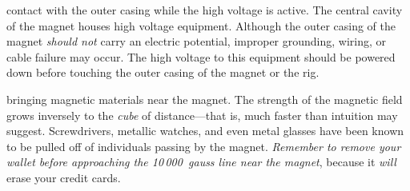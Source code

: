\begin{avoid} contact with the outer casing while the high voltage is active.  The central cavity of the magnet houses high voltage equipment.  Although the outer casing of the magnet \textit{should not} carry an electric potential, improper grounding, wiring, or cable failure may occur.  The high voltage to this equipment should be powered down before touching the outer casing of the magnet or the rig.\end{avoid}

\begin{avoid} bringing magnetic materials near the magnet.  The strength of the magnetic field grows inversely to the \textit{cube} of distance---that is, much faster than intuition may suggest.  Screwdrivers, metallic watches, and even metal glasses have been known to be pulled off of individuals passing by the magnet.  \textit{Remember to remove your wallet before approaching the 10\,000~gauss line near the magnet}, because it \textit{will} erase your credit cards.\end{avoid}


